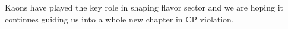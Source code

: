 Kaons have played the key role in shaping flavor sector and we are hoping it continues guiding us into a whole new chapter in CP violation.



\lipsum[3-8]




